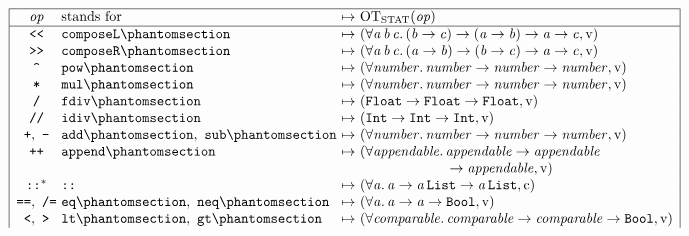 \begin{figure}[htbp]
\centering
\small
\setlength{\arraycolsep}{3pt}
\[
\begin{array}{|c@{\ }l@{\ }c@{\ }l|}
\hline
\opv & \text{stands for} & \mapsto & \OTstat(\opv)\\
\hline
\kw{<{}<} & \kw{composeL}\citelabel{b:Basics.composeL} & \mapsto & (\forall\mv{a}\,\mv{b}\,\mv{c}.\,(\mv{b} \rightarrow \mv{c}) \rightarrow (\mv{a} \rightarrow \mv{b}) \rightarrow \mv{a} \rightarrow \mv{c}, \isv)\\
\kw{>{}>} & \kw{composeR}\citelabel{b:Basics.composeR} & \mapsto & (\forall\mv{a}\,\mv{b}\,\mv{c}.\,(\mv{a} \rightarrow \mv{b}) \rightarrow (\mv{b} \rightarrow \mv{c}) \rightarrow \mv{a} \rightarrow \mv{c}, \isv)\\
\kw{\textasciicircum} & \kw{pow}\citelabel{b:Basics.pow} & \mapsto & (\forall\mv{number}.\,\mv{number} \rightarrow \mv{number} \rightarrow \mv{number}, \isv)\\
\kw{*} & \kw{mul}\citelabel{b:Basics.mul} & \mapsto & (\forall\mv{number}.\,\mv{number} \rightarrow \mv{number} \rightarrow \mv{number}, \isv)\\
\kw{/} & \kw{fdiv}\citelabel{b:Basics.fdiv} & \mapsto & (\tFloat \rightarrow \tFloat \rightarrow \tFloat, \isv)\\
\kw{//} & \kw{idiv}\citelabel{b:Basics.idiv} & \mapsto & (\tInt \rightarrow \tInt \rightarrow \tInt, \isv)\\
\kw{+},\ \kw{-} & \kw{add}\citelabel{b:Basics.add},\ \kw{sub}\citelabel{b:Basics.sub} & \mapsto & (\forall\mv{number}.\,\mv{number} \rightarrow \mv{number} \rightarrow \mv{number}, \isv)\\
\kw{++} & \kw{append}\citelabel{b:Basics.append} & \mapsto & (\forall\mv{appendable}.\,\mv{appendable} \rightarrow \mv{appendable}\\
 & & & \phantom{(\forall\mv{appendable}.\,}{} \rightarrow \mv{appendable}, \isv)\\
\kw{::}^{*} & \kw{::}\citealso{b:List} & \mapsto & (\forall\mv{a}.\,\mv{a} \rightarrow \mv{a}\,\tList \rightarrow \mv{a}\,\tList, \isc)\\
\kw{==},\ \kw{/=} & \kw{eq}\citelabel{b:Basics.eq},\ \kw{neq}\citelabel{b:Basics.neq} & \mapsto & (\forall\mv{a}.\,\mv{a} \rightarrow \mv{a} \rightarrow \tBool, \isv)\\
\kw{<},\ \kw{>} & \kw{lt}\citelabel{b:Basics.lt},\ \kw{gt}\citelabel{b:Basics.gt} & \mapsto & (\forall\mv{comparable}.\,\mv{comparable} \rightarrow \mv{comparable} \rightarrow \tBool, \isv)\\

\end{array}\]
\end{figure}
